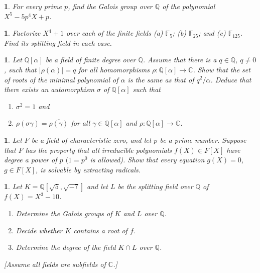 \documentclass[a4paper,11pt,final,openany]{memoir}
\newtheorem{exercise}[Y]{}
\theoremstyle{nonumberplain}
\begin{document}
\begin{exercise}
\label{x67} For every prime $p$, find the Galois group over ${\mathbb{Q}}$ of
the polynomial $X^{5}-5p^{4}X+p$.
\end{exercise}

\begin{exercise}
\label{x68} Factorize $X^{4}+1$ over each of the finite fields (a)
$\mathbb{F}_{5}$; (b) $\mathbb{F}_{25}$; and (c) $\mathbb{F}_{125} $. Find its
splitting field in each case.
\end{exercise}

\begin{exercise}
\label{x69} Let ${\mathbb{Q}}[\alpha]$ be a field of finite degree over
${\mathbb{Q}}$. Assume that there is a $q\in{\mathbb{Q}}$, $q\neq0$, such that
$|\rho(\alpha)|=q$ for all homomorphisms $\rho\colon{\mathbb{Q}}%
[\alpha]\rightarrow\mathbb{C}$. Show that the set of roots of the minimal
polynomial of $\alpha$ is the same as that of $q^{2}/\alpha$. Deduce that
there exists an automorphism $\sigma$ of ${\mathbb{Q}}[\alpha]$ such that

\begin{enumerate}
\item $\sigma^{2}=1$ and

\item $\rho(\sigma\gamma)=\overline{\rho(\gamma)}$ for all $\gamma
\in{\mathbb{Q}}[\alpha]$ and $\rho\colon{\mathbb{Q}}[\alpha]\rightarrow
\mathbb{C}$.
\end{enumerate}
\end{exercise}

\begin{exercise}
\label{x70} Let $F$ be a field of characteristic zero, and let $p$ be a prime
number. Suppose that $F$ has the property that all irreducible polynomials
$f(X)\in F[X]$ have degree a power of $p$ $(1=p^{0}$ is allowed). Show that
every equation $g(X)=0$, $g\in F[X]$, is solvable by extracting radicals.
\end{exercise}

\begin{exercise}
\label{x71} Let $K={\mathbb{Q}}[\sqrt5,\sqrt{-7}]$ and let $L$ be the
splitting field over ${\mathbb{Q}}$ of $f(X)=X^{3}-10$.

\begin{enumerate}
\item Determine the Galois groups of $K$ and $L$ over ${\mathbb{Q}}$.

\item Decide whether $K$ contains a root of $f$.

\item Determine the degree of the field $K\cap L$ over ${\mathbb{Q}}$.
\end{enumerate}

[Assume all fields are subfields of $\mathbb{C}{}$.]
\end{exercise}
\end{document}
